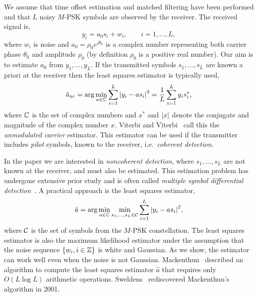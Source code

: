 \documentclass{article}
\begin{document}
We assume that time offset estimation and matched filtering have been performed and that $L$ noisy $M$-PSK symbols are observed by the receiver.  The received signal is,
\begin{equation}\label{eq:sigmod}
y_i = a_0 s_i + w_i, \qquad i = 1, \dots, L,
\end{equation}
where $w_i$ is noise and $a_0 = \rho_0 e^{j\theta_0}$ is a complex number representing both carrier phase $\theta_0$ and amplitude $\rho_0$ (by definition $\rho_0$ is a positive real number).  Our aim is to estimate $a_0$ from $y_1, \dots, y_L$.  If the transmitted symbols $s_1, \dots, s_L$ are known a priori at the receiver then the least squares estimator is typically used,
\begin{equation}\label{eq:hataumod}
\hat{a}_{\text{uc}} = \arg \min_{a \in {\mathbb C}} \sum_{i = 1}^L {\left\vert  y_i - a s_i  \right\vert}^2  = \frac{1}{L} \sum_{i = 1}^L y_i s_i^*,
\end{equation}
where ${\mathbb C}$ is the set of complex numbers and $x^*$ and ${\left\vert x \right\vert}$ denote the conjugate and magnitude of the complex number $x$.  Viterbi and Viterbi~\cite{ViterbiViterbi_phase_est_1983} call this the \emph{unmodulated carrier} estimator.  This estimator can be used if the transmitter includes \emph{pilot} symbols, known to the receiver, i.e.~\emph{coherent detection}.

In the paper we are interested in \emph{noncoherent detection}, where $s_1, \dots, s_L$ are not known at the receiver, and must also be estimated.  This estimation problem has undergone extensive prior study and is often called \emph{multiple symbol differential detection}~\cite{ViterbiViterbi_phase_est_1983,Cowley_ref_sym_carr_1998,Wilson1989,Makrakis1990,Liu1991,Mackenthun1994,Sweldens2001,McKilliamLinearTimeBlockPSK2009,Divsalar1990}.  A practical approach is the least squares estimator,
\begin{equation}\label{eq:hatadef}
\hat{a} = \arg\min_{a \in {\mathbb C}} \min_{s_1, \dots, s_L \in \mathcal C} \sum_{i = 1}^L {\left\vert  y_i - a s_i  \right\vert}^2,
\end{equation}
where $\mathcal C$ is the set of symbols from the $M$-PSK constellation.  The least squares estimator is also the maximum likelihood estimator under the assumption that the noise sequence $\{w_i, i \in {\mathbb Z}\}$ is white and Gaussian.  As we show, the estimator can work well even when the noise is not Gaussian.  Mackenthun~\cite{Mackenthun1994} described an algorithm to compute the least squares estimator $\hat{a}$ that requires only $O(L \log L)$ arithmetic operations.  Sweldens~\cite{Sweldens2001} rediscovered Mackenthun's algorithm in 2001.
\end{document}
